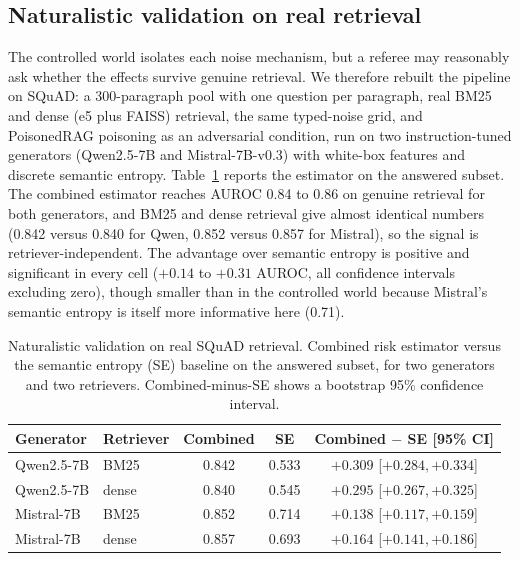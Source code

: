 \documentclass[11pt]{article}
\begin{document}
\subsection{Naturalistic validation on real retrieval}
\label{sec:naturalistic}
The controlled world isolates each noise mechanism, but a referee may
reasonably ask whether the effects survive genuine retrieval. We
therefore rebuilt the pipeline on SQuAD: a 300-paragraph pool with one
question per paragraph, real BM25 and dense (e5 plus FAISS) retrieval,
the same typed-noise grid, and PoisonedRAG poisoning
\citep{zou2025poisonedrag} as an adversarial condition, run on two
instruction-tuned generators (Qwen2.5-7B and Mistral-7B-v0.3) with
white-box features and discrete semantic entropy.
Table~\ref{tab:natauroc} reports the estimator on the answered subset.
The combined estimator reaches AUROC 0.84 to 0.86 on genuine retrieval
for both generators, and BM25 and dense retrieval give almost identical
numbers (0.842 versus 0.840 for Qwen, 0.852 versus 0.857 for Mistral),
so the signal is retriever-independent. The advantage over semantic
entropy is positive and significant in every cell ($+0.14$ to $+0.31$
AUROC, all confidence intervals excluding zero), though smaller than in
the controlled world because Mistral's semantic entropy is itself more
informative here (0.71).

\begin{table}[tbp]
\centering\small
\caption{Naturalistic validation on real SQuAD retrieval. Combined risk
estimator versus the semantic entropy (SE) baseline on the answered
subset, for two generators and two retrievers. Combined-minus-SE shows a
bootstrap 95\% confidence interval.}
\label{tab:natauroc}
\begin{tabular}{llccc}
\toprule
Generator & Retriever & Combined & SE & Combined $-$ SE [95\% CI] \\
\midrule
Qwen2.5-7B & BM25  & 0.842 & 0.533 & $+0.309$ [$+0.284, +0.334$] \\
Qwen2.5-7B & dense & 0.840 & 0.545 & $+0.295$ [$+0.267, +0.325$] \\
Mistral-7B & BM25  & 0.852 & 0.714 & $+0.138$ [$+0.117, +0.159$] \\
Mistral-7B & dense & 0.857 & 0.693 & $+0.164$ [$+0.141, +0.186$] \\
\bottomrule
\end{tabular}
\end{table}
\end{document}
